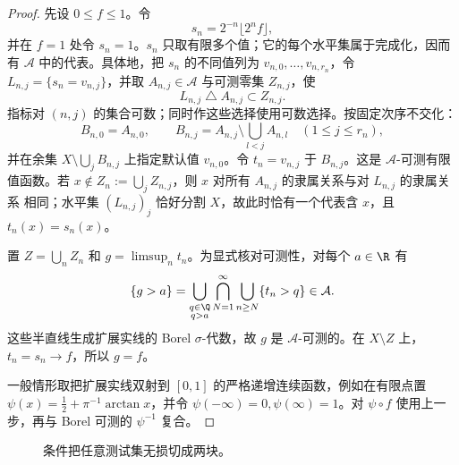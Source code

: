 \begin{proof}
先设 $0\le f\le1$。令
\[
 s_n=2^{-n}\lfloor 2^nf\rfloor,
\]
并在 $f=1$ 处令 $s_n=1$。$s_n$ 只取有限多个值；它的每个水平集属于完成化，因而有
$\mathcal A$ 中的代表。具体地，把 $s_n$ 的不同值列为 $v_{n,0},\dots,v_{n,r_n}$，令
$L_{n,j}=\{s_n=v_{n,j}\}$，并取 $A_{n,j}\in\mathcal A$ 与可测零集 $Z_{n,j}$，使
\[
 L_{n,j}\mathbin\triangle A_{n,j}\subset Z_{n,j}.
\]
指标对 $(n,j)$ 的集合可数；同时作这些选择使用可数选择。按固定次序不交化：
\[
 B_{n,0}=A_{n,0},\qquad
 B_{n,j}=A_{n,j}\setminus\bigcup_{l<j}A_{n,l}\quad(1\le j\le r_n),
\]
并在余集 $X\setminus\bigcup_jB_{n,j}$ 上指定默认值 $v_{n,0}$。令 $t_n=v_{n,j}$ 于
$B_{n,j}$。这是 $\mathcal A$-可测有限值函数。若
$x\notin Z_n:=\bigcup_jZ_{n,j}$，则 $x$ 对所有 $A_{n,j}$ 的隶属关系与对 $L_{n,j}$ 的隶属关系
相同；水平集 $(L_{n,j})_j$ 恰好分割 $X$，故此时恰有一个代表含 $x$，且
$t_n(x)=s_n(x)$。

置 $Z=\bigcup_nZ_n$ 和 $g=\limsup_nt_n$。为显式核对可测性，对每个 $a\in\R$ 有
\[
 \{g>a\}
 =\bigcup_{\substack{q\in\Q\\q>a}}
   \bigcap_{N=1}^{\infty}\bigcup_{n\ge N}\{t_n>q\}\in\mathcal A.
\]
这些半直线生成扩展实线的 Borel $\sigma$-代数，故 $g$ 是 $\mathcal A$-可测的。在
$X\setminus Z$ 上，
$t_n=s_n\to f$，所以 $g=f$。

一般情形取把扩展实线双射到 $[0,1]$ 的严格递增连续函数，例如在有限点置
$\psi(x)=\tfrac12+\pi^{-1}\arctan x$，并令 $\psi(-\infty)=0,\psi(\infty)=1$。对
$\psi\circ f$ 使用上一步，再与 Borel 可测的 $\psi^{-1}$ 复合。
\end{proof}

\begin{figure}[htbp]
\centering
{}
\caption{\Caratheodory{} 条件把任意测试集无损切成两块。}
\label{fig:caratheodory-lossless-cut}
\end{figure}

